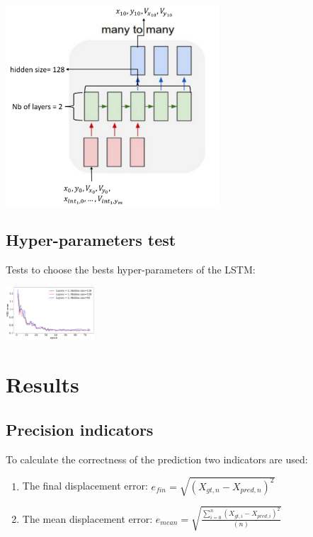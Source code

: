 \documentclass[a0,portrait]{a0poster}
\begin{document}
\begin{multicols}{2}
\begin{minipage}[]{0.5\linewidth}
\centerline {\includegraphics[width=0.6\textwidth]{figure/manytomany}}
\end{minipage}


\subsection*{Hyper-parameters test}
Tests to choose the bests hyper-parameters of the LSTM:\\
\centerline {\includegraphics[width=0.25\textwidth]{figure/hyperparam}}


\section*{Results}
\subsection*{Precision indicators}
To calculate the correctness of the prediction two indicators are used:
\begin{enumerate}
\justifying
\item The final displacement error: $e_{fin} = \sqrt{(X_{gt,n}-X_{pred,n})^2}$
\item The mean displacement error: $e_{mean} = \sqrt{\frac{\sum_{i=0}^n(X_{gt,i}-X_{pred,i})^2}{(n)}}$
\end{enumerate}


\end{multicols}
\end{document}
